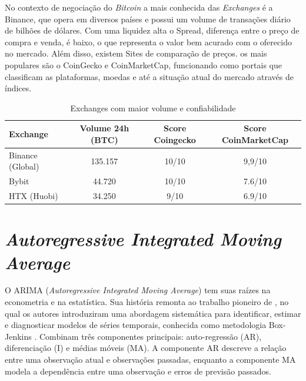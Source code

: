 No contexto de negociação do \textit{Bitcoin} a mais conhecida das \textit{Exchanges} é a Binance, que opera em diversos países e possui um volume de transações diário de bilhões de dólares.
Com uma liquidez alta o Spread, diferença entre o preço de compra e venda, é baixo, o que representa o valor bem acurado com o oferecido no mercado.
Além disso, existem Sites de comparação de preços. os mais populares são o CoinGecko e CoinMarketCap, funcionando
como portais que classificam as plataformas, moedas e até a situação atual do mercado através de índices.


\begin{table}[!htb]
  \caption{Exchanges com maior volume e confiabilidade} \label{tabela:lista_produtos}
  \begin{tabularx}{\textwidth}{l|c|c|c} \hline
    Exchange      & Volume 24h (BTC) & Score Coingecko & Score CoinMarketCap  \\ \hline
    Binance (Global)      & 135.157      & 10/10        & 9,9/10 \\
    Bybit         & 44.720      & 10/10        & 7.6/10  \\
    HTX (Huobi)       & 34.250     & 9/10        & 6.9/10  \\ \hline
  \end{tabularx}
\end{table}


\section{\textit{Autoregressive Integrated Moving Average}} \label{sec:arima}

O ARIMA (\textit{Autoregressive Integrated Moving Average}) tem suas raízes na econometria e na estatística.
Sua história remonta ao trabalho pioneiro de \textcite{Box}, no qual os autores introduziram uma abordagem sistemática para identificar, estimar e diagnosticar modelos de séries temporais, conhecida como metodologia Box-Jenkins \cite{Arima}.
Combinam três componentes principais: auto-regressão (AR), diferenciação (I) e médias móveis (MA). A componente AR descreve a relação entre uma observação atual e observações passadas, enquanto a componente MA modela a dependência entre uma observação e erros de previsão passados. 

